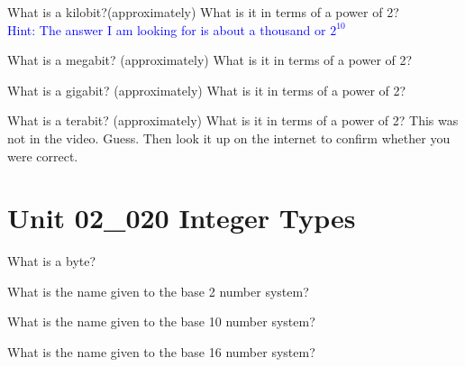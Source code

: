 \documentclass[letterpaper,12pt]{exam}
\newcommand{\unit}{Unit 02}
\begin{document}
\begin{questions}
\begin{samepage}
\begin{itemize}
	\end{itemize}
\end{samepage}

\begin{samepage}
	\question What is a kilobit?(approximately) What is it in terms of a power of 2?\\
	\textcolor{blue}{Hint: The answer I am looking for is about a thousand or $2^{10}$}
	\vspace{5mm}
\end{samepage}

\begin{samepage}
	\question What is a megabit? (approximately) What is it in terms of a power of 2?
	\vspace{5mm}
\end{samepage}

\begin{samepage}
	\question What is a gigabit? (approximately) What is it in terms of a power of 2?
	\vspace{5mm}
\end{samepage}

\begin{samepage}
	\question What is a terabit? (approximately) What is it in terms of a power of 2?  This was not in the video.  Guess.  Then look it up on the internet to confirm whether you were correct.
	\vspace{5mm}
\end{samepage}

\section*{\unit\_020 Integer Types} %
\begin{samepage}
	\question What is a byte?
	\vspace{5mm}
\end{samepage}
\begin{samepage}
	\question What is the name given to the base 2 number system?
	\vspace{5mm}
\end{samepage}
\begin{samepage}
	\question What is the name given to the base 10 number system?
	\vspace{5mm}
\end{samepage}
\begin{samepage}
	\question What is the name given to the base 16 number system?
	\vspace{5mm}
\end{samepage}


\end{questions}
\end{document}
